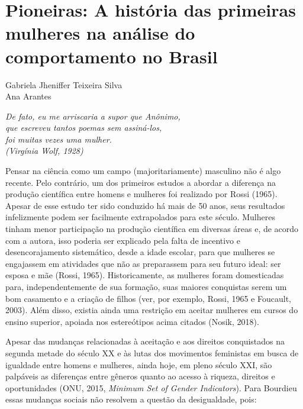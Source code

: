 \setcounter{footnote}{0}
\setcounter{figure}{0}
\setcounter{table}{0}
\chapter*{Pioneiras: A história das primeiras mulheres na análise do comportamento no Brasil}
\begin{flushright}
\begin{small}
Gabriela Jheniffer Teixeira Silva\\
Ana Arantes\\
\end{small}
\vspace{1cm}

\emph{De fato, eu me arriscaria a supor que Anônimo,\\
que escreveu tantos poemas sem assiná-los,\\
foi muitas vezes uma mulher.\\
(Virgínia Wolf, 1928)}
\end{flushright}

Pensar na ciência como um campo (majoritariamente) masculino não é algo recente. Pelo contrário, um dos primeiros estudos a abordar a diferença na produção científica entre homens e mulheres foi realizado por Rossi (1965). Apesar de esse estudo ter sido conduzido há mais de 50 anos, seus resultados infelizmente podem ser facilmente extrapolados para este século. Mulheres tinham menor participação na produção científica em diversas áreas e, de acordo com a autora, isso poderia ser explicado pela falta de incentivo e desencorajamento sistemático, desde a idade escolar, para que mulheres se engajassem em atividades que não as preparassem para seu futuro ideal: ser esposa e mãe (Rossi, 1965). Historicamente, as mulheres foram domesticadas para, independentemente de sua formação, suas maiores conquistas serem um bom casamento e a criação de filhos (ver, por exemplo, Rossi, 1965 e Foucault, 2003). Além disso, existia ainda uma restrição em aceitar mulheres em cursos do ensino superior, apoiada nos estereótipos acima citados (Nosik, 2018).

Apesar das mudanças relacionadas à aceitação e aos direitos conquistados na segunda metade do século XX e às lutas dos movimentos feministas em busca de igualdade entre homens e mulheres, ainda hoje, em pleno século XXI, são palpáveis as diferenças entre gêneros quanto ao acesso à riqueza, direitos e oportunidades (ONU, 2015, \textit{Minimum Set of Gender Indicators}). Para Bourdieu essas mudanças sociais não resolvem a questão da desigualdade, pois:

